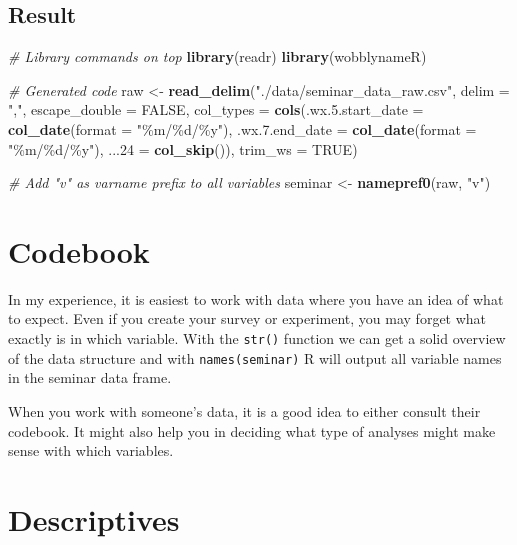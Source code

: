 \documentclass[
]{book}
\newenvironment{Shaded}{\begin{snugshade}}{\end{snugshade}}
\newcommand{\AttributeTok}[1]{\textcolor[rgb]{0.13,0.29,0.53}{#1}}
\newcommand{\CommentTok}[1]{\textcolor[rgb]{0.56,0.35,0.01}{\textit{#1}}}
\newcommand{\ConstantTok}[1]{\textcolor[rgb]{0.56,0.35,0.01}{#1}}
\newcommand{\FunctionTok}[1]{\textcolor[rgb]{0.13,0.29,0.53}{\textbf{#1}}}
\newcommand{\NormalTok}[1]{#1}
\newcommand{\OtherTok}[1]{\textcolor[rgb]{0.56,0.35,0.01}{#1}}
\newcommand{\StringTok}[1]{\textcolor[rgb]{0.31,0.60,0.02}{#1}}
\begin{document}
\subsection*{Result}\label{result}

\begin{Shaded}
\begin{Highlighting}[]
\CommentTok{\# Library commands on top}
\FunctionTok{library}\NormalTok{(readr)}
\FunctionTok{library}\NormalTok{(wobblynameR)}

\CommentTok{\# Generated code}
\NormalTok{raw }\OtherTok{\textless{}{-}} \FunctionTok{read\_delim}\NormalTok{(}\StringTok{"./data/seminar\_data\_raw.csv"}\NormalTok{, }
    \AttributeTok{delim =} \StringTok{","}\NormalTok{, }\AttributeTok{escape\_double =} \ConstantTok{FALSE}\NormalTok{, }
    \AttributeTok{col\_types =} \FunctionTok{cols}\NormalTok{(}\AttributeTok{.wx.5.start\_date =} \FunctionTok{col\_date}\NormalTok{(}\AttributeTok{format =} \StringTok{"\%m/\%d/\%y"}\NormalTok{),}
                     \AttributeTok{.wx.7.end\_date =} \FunctionTok{col\_date}\NormalTok{(}\AttributeTok{format =} \StringTok{"\%m/\%d/\%y"}\NormalTok{), }
                     \AttributeTok{...24 =} \FunctionTok{col\_skip}\NormalTok{()),}
    \AttributeTok{trim\_ws =} \ConstantTok{TRUE}\NormalTok{)}

\CommentTok{\# Add "v" as varname prefix to all variables}
\NormalTok{seminar }\OtherTok{\textless{}{-}} \FunctionTok{namepref0}\NormalTok{(raw, }\StringTok{"v"}\NormalTok{)}
\end{Highlighting}
\end{Shaded}

\section{Codebook}\label{codebook}

In my experience, it is easiest to work with data where you have an idea of what to expect.
Even if you create your survey or experiment, you may forget what exactly is in which variable.
With the \texttt{str()} function we can get a solid overview of the data structure and with \texttt{names(seminar)} R will output all variable names in the seminar data frame.

When you work with someone's data, it is a good idea to either consult their codebook.
It might also help you in deciding what type of analyses might make sense with which variables.

\section{Descriptives}\label{descriptives}
\end{document}
